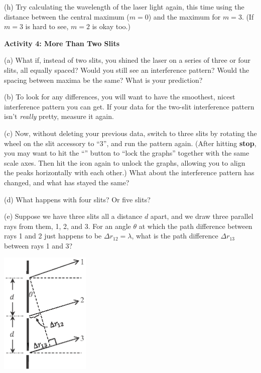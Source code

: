 (h) Try calculating the wavelength of the laser light again, this time using the distance between the central maximum ($m=0$) and the maximum for $m=3$.  (If $m=3$ is hard to see, $m=2$ is okay too.)
\answerspace{0.9in}


\pagebreak[2]
\textbf{Activity 4: More Than Two Slits}

(a) What if, instead of two slits, you shined the laser on a series of three or four slits, all equally spaced?  Would you still see an interference pattern?  Would the spacing between maxima be the same?  What is your prediction?
\answerspace{0.8in}

(b) To look for any differences, you will want to have the smoothest, nicest interference pattern you can get.  If your data for the two-slit interference pattern isn't \textit{really} pretty, measure it again.  

(c) Now, without deleting your previous data, switch to three slits by rotating the wheel on the slit accessory 
to ``3'', and run the pattern again.  (After hitting \textbf{stop}, you may want to hit the
``''
button to ``lock the graphs'' together with the same scale axes.  Then hit the icon again to unlock the graphs, allowing you to align the peaks horizontally with each other.)  What about the interference pattern has changed, and what has stayed the same?
\answerspace{0.8in}

(d) What happens with four slits?  Or five slits?
\answerspace{0.8in}

(e) Suppose we have three slits all a distance $d$ apart, and we draw three parallel rays from them, 1, 2, and 3.  For an angle $\theta$ at which the path difference between rays 1 and 2 just happens to be $\Delta r_{12} = \lambda$, what is the path difference $\Delta r_{13}$ between rays 1 and 3?

\hspace{0.5in}\includegraphics[width=1.7in]{interference_of_light/three_slits.eps}

